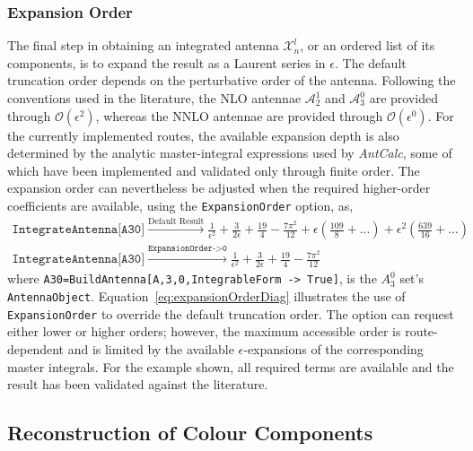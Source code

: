 \subsubsection{Expansion Order}

The final step in obtaining an integrated antenna $\mathcal X_n^l$, or an ordered list of its
components, is to expand the result as a Laurent series in $\epsilon$. The default truncation
order depends on the perturbative order of the antenna. Following the conventions used in the
literature, the NLO antennae $\mathcal A_2^1$ and $\mathcal A_3^0$ are provided through
$\mathcal O(\epsilon^2)$, whereas the NNLO antennae are provided through $\mathcal O(\epsilon^0)$.
For the currently implemented routes, the available expansion depth is also determined by the
analytic master-integral expressions used by \textit{AntCalc}, some of which have been
implemented and validated only through finite order. The expansion order can nevertheless be
adjusted when the required higher-order coefficients are available, using the
\texttt{ExpansionOrder} option, as,
\begin{equation}\label{eq:expansionOrderDiag}
    \begin{gathered}
        \texttt{IntegrateAntenna[A30]} \xrightarrow{\text{Default Result}}\frac{1}{\epsilon^2}+\frac{3}{2\epsilon}+\frac{19}{4}-\frac{7\pi^2}{12}+\epsilon\!\left(\frac{109}{8}+...\right)+\epsilon^2\!\left(\frac{639}{16}+...\right)\\
        \texttt{IntegrateAntenna[A30]} \xrightarrow{\texttt{ExpansionOrder->0}}\frac{1}{\epsilon^2}+\frac{3}{2\epsilon}+\frac{19}{4}-\frac{7\pi^2}{12}
    \end{gathered}
\end{equation}
where \texttt{A30=BuildAntenna[A,3,0,IntegrableForm -> True]}, is the $A_3^0$ set's \\
\texttt{AntennaObject}. Equation~\eqref{eq:expansionOrderDiag} illustrates the use of
\texttt{ExpansionOrder} to override the default truncation order. The option can request
either lower or higher orders; however, the maximum accessible order is route-dependent and is
limited by the available $\epsilon$-expansions of the corresponding master integrals. For the
example shown, all required terms are available and the result has been validated against the
literature.

\subsection{Reconstruction of Colour Components}


